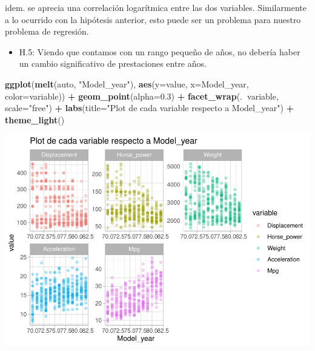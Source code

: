 \documentclass[
]{article}
\newenvironment{Shaded}{\begin{snugshade}}{\end{snugshade}}
\newcommand{\DataTypeTok}[1]{\textcolor[rgb]{0.13,0.29,0.53}{#1}}
\newcommand{\FloatTok}[1]{\textcolor[rgb]{0.00,0.00,0.81}{#1}}
\newcommand{\KeywordTok}[1]{\textcolor[rgb]{0.13,0.29,0.53}{\textbf{#1}}}
\newcommand{\NormalTok}[1]{#1}
\newcommand{\OperatorTok}[1]{\textcolor[rgb]{0.81,0.36,0.00}{\textbf{#1}}}
\newcommand{\StringTok}[1]{\textcolor[rgb]{0.31,0.60,0.02}{#1}}
\providecommand{\tightlist}{%
  \setlength{\itemsep}{0pt}\setlength{\parskip}{0pt}}
\begin{document}
idem. se aprecia una correlación logarítmica entre las dos variables.
Similarmente a lo ocurrido con la hipótesis anterior, esto puede ser un
problema para nuestro problema de regresión.

\begin{itemize}
\tightlist
\item
  H.5: Viendo que contamos con un rango pequeño de años, no debería
  haber un cambio significativo de prestaciones entre años.
\end{itemize}

\begin{Shaded}
\begin{Highlighting}[]
\KeywordTok{ggplot}\NormalTok{(}\KeywordTok{melt}\NormalTok{(auto, }\StringTok{"Model_year"}\NormalTok{), }\KeywordTok{aes}\NormalTok{(}\DataTypeTok{y=}\NormalTok{value, }\DataTypeTok{x=}\NormalTok{Model_year, }\DataTypeTok{color=}\NormalTok{variable)) }\OperatorTok{+}
\StringTok{  }\KeywordTok{geom_point}\NormalTok{(}\DataTypeTok{alpha=}\FloatTok{0.3}\NormalTok{) }\OperatorTok{+}
\StringTok{  }\KeywordTok{facet_wrap}\NormalTok{(.}\OperatorTok{~}\NormalTok{variable, }\DataTypeTok{scale=}\StringTok{"free"}\NormalTok{) }\OperatorTok{+}
\StringTok{  }\KeywordTok{labs}\NormalTok{(}\DataTypeTok{title=}\StringTok{"Plot de cada variable respecto a Model_year"}\NormalTok{) }\OperatorTok{+}
\StringTok{  }\KeywordTok{theme_light}\NormalTok{()}
\end{Highlighting}
\end{Shaded}

\begin{center}\includegraphics{EDA_files/figure-latex/unnamed-chunk-29-1} \end{center}
\end{document}
